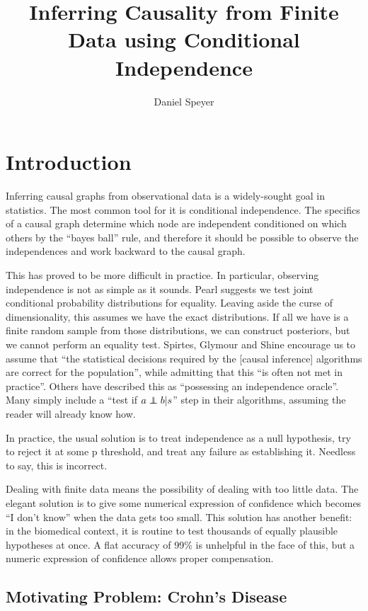 \documentclass[twocolumn,12pt]{article}
\title{Inferring Causality from Finite Data using Conditional Independence}
\author{Daniel Speyer}
\newcommand\indep{\protect\mathpalette{\protect\independenT}{\perp}}
\def\independenT#1#2{\mathrel{\rlap{$#1#2$}\mkern2mu{#1#2}}}
\begin{document}
\maketitle

\section{Introduction}

Inferring causal graphs from observational data is a widely-sought
goal in statistics.  The most common tool for it is conditional
independence.  The specifics of a causal graph determine which node
are independent conditioned on which others by the ``bayes ball''
rule, and therefore it should be possible to observe the independences
and work backward to the causal graph.

This has proved to be more difficult in practice.  In particular,
observing independence is not as simple as it sounds.  Pearl suggests
we test joint conditional probability distributions for equality\cite{Pearl}.
Leaving aside the curse of dimensionality, this assumes we have the
exact distributions.  If all we have is a finite random sample from
those distributions, we can construct posteriors, but we cannot perform
an equality test.  Spirtes, Glymour and Shine  encourage us to assume that
``the statistical decisions required by the [causal inference]
algorithms are correct
for the population'', while admitting that this ``is often not met in
practice''\cite{Spirtes}.  Others have described this as ``possessing an
independence oracle''\cite{Peters,pcalg}.  Many simply include a ``test if $a\indep
b|s$'' step in their algorithms, assuming the reader will already know
how.

In practice, the usual solution is to treat independence as a null
hypothesis, try to reject it at some p threshold, and treat any
failure as establishing it.  Needless to say, this is incorrect.

Dealing with finite data means the possibility of dealing with too
little data.  The elegant solution is to give some numerical
expression of confidence which becomes ``I don't know'' when the data
gets too small.  This solution has another benefit: in the biomedical
context, it is routine to test thousands of equally plausible
hypotheses at once.  A flat accuracy of 99\% is unhelpful in the face
of this, but a numeric expression of confidence allows proper
compensation.

\subsection{Motivating Problem: Crohn's Disease}
\end{document}
